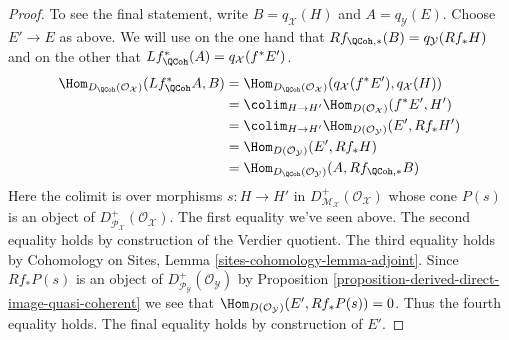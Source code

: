 \begin{proof}
\medskip\noindent
To see the final statement, write $B = q_\mathcal{X}(H)$ and
$A = q_\mathcal{Y}(E)$.
Choose $E' \to E$ as above.
We will use on the one hand that
$Rf_{\QCoh, *}(B) = q_\mathcal{Y}(Rf_*H)$
and on the other that
$Lf^*_\QCoh(A) = q_\mathcal{X}(f^*E')$.
\begin{align*}
\Hom_{D_\QCoh(\mathcal{O}_\mathcal{X})}(Lf^*_\QCoh A, B)
& = 
\Hom_{D_\QCoh(\mathcal{O}_\mathcal{X})}(q_\mathcal{X}(f^*E'),
q_\mathcal{X}(H)) \\
& = 
\colim_{H \to H'} \Hom_{D(\mathcal{O}_\mathcal{X})}(f^*E', H') \\
& = \colim_{H \to H'} \Hom_{D(\mathcal{O}_\mathcal{Y})}(E', Rf_*H') \\
& = \Hom_{D(\mathcal{O}_\mathcal{Y})}(E', Rf_*H) \\
& =
\Hom_{D_\QCoh(\mathcal{O}_\mathcal{Y})}(A, Rf_{\QCoh, *}B)
\end{align*}
Here the colimit is over morphisms $s : H \to H'$ in
$D^+_{\mathcal{M}_\mathcal{X}}(\mathcal{O}_\mathcal{X})$
whose cone $P(s)$ is an object of
$D^+_{\mathcal{P}_\mathcal{X}}(\mathcal{O}_\mathcal{X})$.
The first equality we've seen above.
The second equality holds by construction of the Verdier quotient.
The third equality holds by
Cohomology on Sites, Lemma \ref{sites-cohomology-lemma-adjoint}.
Since $Rf_*P(s)$ is an object of
$D^+_{\mathcal{P}_\mathcal{Y}}(\mathcal{O}_\mathcal{Y})$ by
Proposition \ref{proposition-derived-direct-image-quasi-coherent}
we see that $\Hom_{D(\mathcal{O}_\mathcal{Y})}(E', Rf_*P(s)) = 0$.
Thus the fourth equality holds. The final equality
holds by construction of $E'$.
\end{proof}














